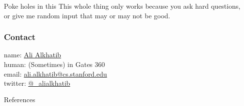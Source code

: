 \documentclass{beamer}
\begin{document}
\begin{frame}{Poke holes in this}
This whole thing only works because you ask hard questions,
or give me random input that may or may not be good.
\end{frame}

\begin{frame}
  \frametitle{Contact}
    name: \href{https://ali-alkhatib.com}{Ali Alkhatib} \\
    human: (Sometimes) in Gates 360 \\
    email: \href{mailto:ali.alkhatib@cs.stanford.edu}{ali.alkhatib@cs.stanford.edu} \\
    twitter: \href{https://twitter.com/_alialkhatib}{@\_alialkhatib} \\
\end{frame}


\begin{frame}[allowframebreaks]{References}
  \printbibliography
%   
%   
\end{frame}
\end{document}

